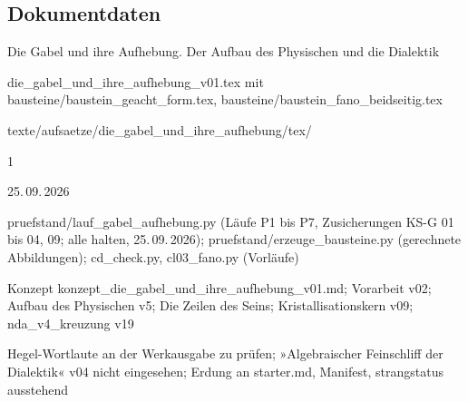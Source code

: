 \documentclass[11pt,a4paper]{article}
\begin{document}
\subsection*{Dokumentdaten}
\begin{description}[itemsep=0pt,font=\normalfont\bfseries]
\item[Titel:] Die Gabel und ihre Aufhebung. Der Aufbau des Physischen und die Dialektik
\item[Datei:] die\_gabel\_und\_ihre\_aufhebung\_v01.tex mit bausteine/baustein\_geacht\_form.tex, bausteine/baustein\_fano\_beidseitig.tex
\item[Ablage:] texte/aufsaetze/die\_gabel\_und\_ihre\_aufhebung/tex/
\item[Version:] 1
\item[Datum:] 25.\,09.\,2026
\item[Prüfstand:] pruefstand/lauf\_gabel\_aufhebung.py (Läufe P1 bis P7, Zusicherungen KS-G 01 bis 04, 09; alle halten, 25.\,09.\,2026); pruefstand/erzeuge\_bausteine.py (gerechnete Abbildungen); cd\_check.py, cl03\_fano.py (Vorläufe)
\item[Grundlage:] Konzept konzept\_die\_gabel\_und\_ihre\_aufhebung\_v01.md; Vorarbeit v02; Aufbau des Physischen v5; Die Zeilen des Seins; Kristallisationskern v09; nda\_v4\_kreuzung v19
\item[Offen:] Hegel-Wortlaute an der Werkausgabe zu prüfen; »Algebraischer Feinschliff der Dialektik« v04 nicht eingesehen; Erdung an starter.md, Manifest, strangstatus ausstehend
\end{description}
\end{document}
